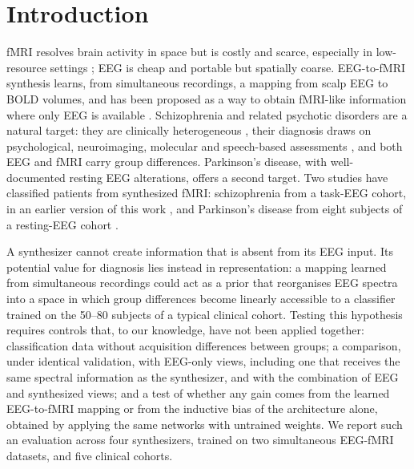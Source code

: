 \documentclass[pdflatex,referee,sn-basic]{sn-jnl}%
\begin{document}

\maketitle

\section{Introduction}\label{section:introduction}

fMRI resolves brain activity in space but is costly and scarce, especially in low-resource settings \cite{ogbole2018survey}; EEG is cheap and portable but spatially coarse. EEG-to-fMRI synthesis learns, from simultaneous recordings, a mapping from scalp EEG to BOLD volumes, and has been proposed as a way to obtain fMRI-like information where only EEG is available \cite{liu2019convolutional, liu2020latent, bricman2021eeg2fmri, calhas2022eeg, roos2025brainwaves, he2025spec2vol, lanzino2024ntvit, li2024neurobolt}. Schizophrenia and related psychotic disorders are a natural target: they are clinically heterogeneous \cite{saha2005systematic}, their diagnosis draws on psychological, neuroimaging, molecular and speech-based assessments \cite{andreou2020structural,neale2015genetic,corcoran2020language}, and both EEG \cite{tan2016eeg,aydin2018cortical,roach2008event,bates2009low} and fMRI \cite{oh2020identifying, velakoulis2006hippocampal, haukvik2013schizophrenia} carry group differences. Parkinson's disease, with well-documented resting EEG alterations, offers a second target. Two studies have classified patients from synthesized fMRI: schizophrenia from a task-EEG cohort, in an earlier version of this work \cite{calhas2023medrxiv}, and Parkinson's disease from eight subjects of a resting-EEG cohort \cite{yao2025catd}.

A synthesizer cannot create information that is absent from its EEG input. Its potential value for diagnosis lies instead in representation: a mapping learned from simultaneous recordings could act as a prior that reorganises EEG spectra into a space in which group differences become linearly accessible to a classifier trained on the 50--80 subjects of a typical clinical cohort. Testing this hypothesis requires controls that, to our knowledge, have not been applied together: classification data without acquisition differences between groups; a comparison, under identical validation, with EEG-only views, including one that receives the same spectral information as the synthesizer, and with the combination of EEG and synthesized views; and a test of whether any gain comes from the learned EEG-to-fMRI mapping or from the inductive bias of the architecture alone, obtained by applying the same networks with untrained weights. We report such an evaluation across four synthesizers, trained on two simultaneous EEG-fMRI datasets, and five clinical cohorts.
\end{document}

